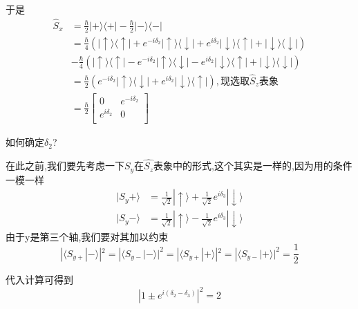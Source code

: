 \documentclass[lang=cn,10pt]{elegantbook}
\begin{document}
 于是
 \begin{equation*}
 	\begin{split}
 		\hat{S}_x&=\frac{\hbar}{2}|+\rangle \langle +|-\frac{\hbar}{2}|-\rangle \langle -|
 		\\
 		&=\frac{\hbar}{4}\left( |\uparrow \rangle \langle \uparrow |+e^{-i\delta _2}|\uparrow \rangle \langle \downarrow |+e^{i\delta _2}|\downarrow \rangle \langle \uparrow |+|\downarrow \rangle \langle \downarrow | \right)\\ &-\frac{\hbar}{4}\left( |\uparrow \rangle \langle \uparrow |-e^{-i\delta _2}|\uparrow \rangle \langle \downarrow |-e^{i\delta _2}|\downarrow \rangle \langle \uparrow |+|\downarrow \rangle \langle \downarrow | \right) 
 		\\
 		&=\frac{\hbar}{2}\left( e^{-i\delta _2}|\uparrow \rangle \langle \downarrow |+e^{i\delta _2}|\downarrow \rangle \langle \uparrow | \right) ,\text{现选取}\hat{S}_z\text{表象}
 		\\
 		&=\frac{\hbar}{2}\left[ \begin{matrix}
 			0&		e^{-i\delta _2}\\
 			e^{i\delta _2}&		0\\
 		\end{matrix} \right] 
 	\end{split}
 \end{equation*}
 
 如何确定$\delta_2$?
 
 在此之前,我们要先考虑一下$\hat{S_y}$在$\hat{S_z}$表象中的形式,这个其实是一样的,因为用的条件一模一样
  \begin{equation*}
 	\begin{split}
 		|S_y+\rangle &=\frac{1}{\sqrt{2}}|\uparrow \rangle +\frac{1}{\sqrt{2}}e^{i\delta _3}|\downarrow \rangle 
 		\\
 		|S_y-\rangle &=\frac{1}{\sqrt{2}}|\uparrow \rangle -\frac{1}{\sqrt{2}}e^{i\delta _3}|\downarrow \rangle 
 	\end{split}
 \end{equation*}
 由于y是第三个轴,我们要对其加以约束
 \begin{equation*}
 	|\langle S_{y+}|-\rangle|^{2}=|\langle S_{y-}|-\rangle|^{2}= |\langle S_{y+}|+\rangle|^{2}= |\langle S_{y-}|+\rangle|^{2}=\frac{1}{2}
 \end{equation*}
 
 代入计算可得到
 \begin{equation*}
 	|1\pm e^{i\left( \delta _2-\delta _3 \right)}|^2=2
 \end{equation*}
 
\end{document}

